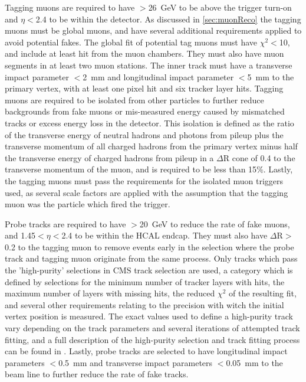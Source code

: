 Tagging muons are required to have \pt$>$\SI{26}{\giga\eV} to be above the trigger turn-on and $\eta<$2.4 to be within the detector. 
As discussed in \cref{sec:muonReco} the tagging muons must be global muons, and have several additional requirements applied to avoid potential fakes.
The global fit of potential tag muons must have $\chi^2<$10, and include at least hit from the muon chambers. 
They must also have muon segments in at least two muon stations.
The inner track must have a transverse impact parameter $<$\SI{2}{\milli\meter} and longitudinal impact parameter $<$\SI{5}{\milli\meter} to the primary vertex, with at least one pixel hit and six tracker layer hits.
Tagging muons are required to be isolated from other particles to further reduce backgrounds from fake muons or mis-measured energy caused by mismatched tracks or excess energy loss in the detector.
This isolation is defined as the ratio of the transverse energy of neutral hadrons and photons from pileup plus the transverse momentum of all charged hadrons from the primary vertex minus half the transverse energy of charged hadrons from pileup in a $\Delta$R cone of 0.4 to the transverse momentum of the muon, and is required to be less than 15$\%$.
Lastly, the tagging muons must pass the requirements for the isolated muon triggers used, as several scale factors are applied with the assumption that the tagging muon was the particle which fired the trigger.

Probe tracks are required to have \pt$>$\SI{20}{\giga\eV} to reduce the rate of fake muons, and 1.45$<\eta<$2.4 to be within the HCAL endcap.
They must also have $\Delta\mathrm{R}>$0.2 to the tagging muon to remove events early in the selection where the probe track and tagging muon originate from the same process.
Only tracks which pass the 'high-purity' selections in CMS track selection are used, a category which is defined by selections for the minimum number of tracker layers with hits, the maximum number of layers with missing hits, the reduced $\chi^2$ of the resulting fit, and several other requirements relating to the precision with witch the initial vertex position is measured.
The exact values used to define a high-purity track vary depending on the track parameters and several iterations of attempted track fitting, and a full description of the high-purity selection and track fitting process can be found in \cite{trackFitting}.
Lastly, probe tracks are selected to have longitudinal impact parameters $<$\SI{0.5}{\milli\meter} and transverse impact parameters $<$\SI{0.05}{\milli\meter} to the beam line to further reduce the rate of fake tracks.

